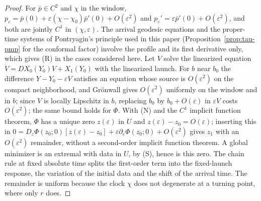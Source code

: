 \documentclass[aip,jmp,amsmath,amssymb,reprint]{revtex4-2}
\theoremstyle{plain}
\theoremstyle{definition}
\begin{document}
\begin{proof}
For $\bar p\in C^2$ and $\chi$ in the window,
$p_\varepsilon=\bar p(0)+\varepsilon(\chi-\chi_0)\bar p'(0)+O(\varepsilon^2)$ and
$p_\varepsilon'=\varepsilon\bar p'(0)+O(\varepsilon^2)$, and both are jointly $C^1$ in $(\chi,\varepsilon)$.
The arrival geodesic equations and the proper-time systems of Pontryagin's principle used in this
paper (Proposition~\ref{prop:tau-pmp} for the conformal factor) involve the profile and its first
derivative only, which gives (R) in the cases considered here. Let $V$ solve the linearized
equation $\dot V=DX_0(Y_0)V+X_1(Y_0)$ with the linearized launch. For $b$ near $b_0$ the
difference $Y-Y_0-\varepsilon V$ satisfies an equation whose source is $O(\varepsilon^2)$ on the
compact neighborhood, and Gr\"onwall gives $O(\varepsilon^2)$ uniformly on the window and in $b$;
since $V$ is locally Lipschitz in $b$, replacing $b_0$ by $b_0+O(\varepsilon)$ in $\varepsilon V$ costs
$O(\varepsilon^2)$;
the same bound holds for $\Phi$. With (N) and the $C^1$ implicit function theorem, $\Phi$ has a
unique zero $z(\varepsilon)$ in $U$ and $z(\varepsilon)-z_0=O(\varepsilon)$; inserting this in
$0=D_z\Phi(z_0;0)[z(\varepsilon)-z_0]+\varepsilon\partial_\varepsilon\Phi(z_0;0)+O(\varepsilon^2)$ gives
$z_1$ with an $O(\varepsilon^2)$ remainder, without a second-order implicit function theorem. A global
minimizer is an extremal with data in $U$, by (S), hence is this zero. The chain rule at fixed
absolute time splits the first-order term into the fixed-launch response, the variation of the
initial data and the shift of the arrival time. The remainder is uniform because the clock $\chi$
does not degenerate at a turning point, where only $r$ does.
\end{proof}
\end{document}

